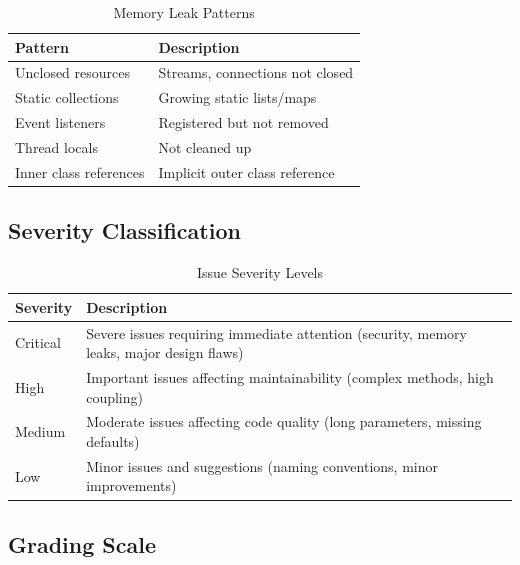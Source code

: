 \documentclass[12pt,a4paper]{article}
\begin{document}
    \begin{table}[H]
        \caption{Memory Leak Patterns}
        \begin{tabular}{|l|l|}
            \hline
            \textbf{Pattern} & \textbf{Description} \\
            \hline
            Unclosed resources & Streams, connections not closed \\
            \hline
            Static collections & Growing static lists/maps \\
            \hline
            Event listeners & Registered but not removed \\
            \hline
            Thread locals & Not cleaned up \\
            \hline
            Inner class references & Implicit outer class reference \\
            \hline
        \end{tabular}
    \end{table}

    \subsection{Severity Classification}

    \begin{table}[H]
        \caption{Issue Severity Levels}
        \begin{tabular}{|l|p{8cm}|}
            \hline
            \textbf{Severity} & \textbf{Description} \\
            \hline
            Critical & Severe issues requiring immediate attention (security, memory leaks, major design flaws) \\
            \hline
            High & Important issues affecting maintainability (complex methods, high coupling) \\
            \hline
            Medium & Moderate issues affecting code quality (long parameters, missing defaults) \\
            \hline
            Low & Minor issues and suggestions (naming conventions, minor improvements) \\
            \hline
        \end{tabular}
    \end{table}

    \subsection{Grading Scale}
\end{document}
